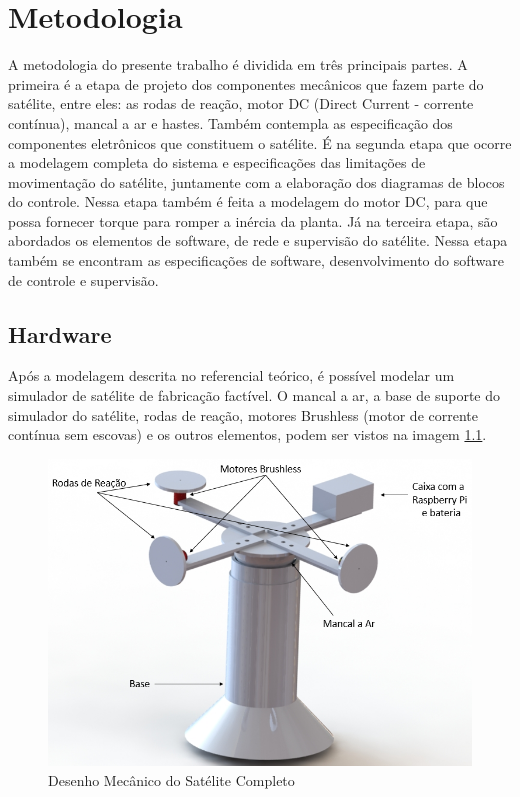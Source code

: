 \chapter{Metodologia}

A metodologia do presente trabalho é dividida em três principais partes. A primeira é a etapa de projeto dos componentes mecânicos que fazem parte do satélite, entre eles: as rodas de reação, motor DC (Direct Current - corrente contínua), mancal a ar e hastes. Também contempla as especificação dos componentes eletrônicos que constituem o satélite. É na segunda etapa que ocorre a modelagem completa do sistema e especificações das limitações de movimentação do satélite, juntamente com a elaboração dos diagramas de blocos do controle. Nessa etapa também é feita a modelagem do motor DC, para que possa fornecer torque para romper a inércia da planta. Já na terceira etapa, são abordados os elementos de software, de rede e supervisão do satélite. Nessa etapa também se encontram as especificações de software, desenvolvimento do software de controle e supervisão.

\section{Hardware}

Após a modelagem descrita no referencial teórico, é possível modelar um simulador de satélite de fabricação factível.  O mancal a ar, a base de suporte do simulador do satélite, rodas de reação, motores Brushless (motor de corrente contínua sem escovas) e os outros elementos, podem ser vistos na imagem \ref{fig:satelite_completo}.

\begin{figure}[H]
  \caption{Desenho Mecânico do Satélite Completo}
  \begin{center}
      \includegraphics[scale=.6]{metodologia/img/satelite_completo}
  \end{center}
  \label{fig:satelite_completo}
\end{figure}

